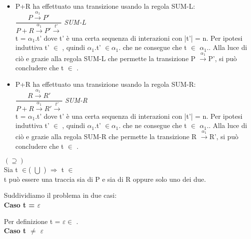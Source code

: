 \begin{itemize}
	\item P+R ha effettuato una transizione usando la regola SUM-L:\\
	
	 	$\dfrac{P \overset{\alpha_{1}}\rightarrow P'}{P + R \overset{\alpha_{1}}\rightarrow P'\overset{t'}\rightarrow}$ \textit{SUM-L} \\
	 	
	 	t = $\alpha_{1}.$t' dove t' è una certa sequenza di interazioni con |t'| = n. Per ipotesi induttiva t' $\in$ , quindi 
	 	$\alpha_{1}.$t' $\in \alpha_{1}.$ che ne consegue che t $\in$ $\alpha_{1}.$. Alla luce di ciò e grazie alla regola SUM-L che permette la transizione P $\overset{\alpha_{1}}\rightarrow $P', si può concludere che  t $\in$  .
	 	\\
	 	
	 \item P+R ha effettuato una transizione usando la regola SUM-R:\\
	 
	 $\dfrac{R \overset{\alpha_{1}}\rightarrow R'}{P + R \overset{\alpha_{1}}\rightarrow R'\overset{t'}\rightarrow}$ \textit{SUM-R} \\
	 
		t = $\alpha_{1}.$t' dove t' è una certa sequenza di interazioni con |t'| = n. Per ipotesi induttiva t' $\in$ , quindi 
	$\alpha_{1}.$t' $\in \alpha_{1}.$ che ne consegue che t $\in$ $\alpha_{1}.$. Alla luce di ciò e grazie alla regola SUM-R che permette la transizione R $\overset{\alpha_{1}}\rightarrow $R', si può concludere che  t $\in$  .
	\\
	 	
\end{itemize}

$(\supseteq)$\\

Sia t $\in$( $\bigcup$ ) $\Rightarrow $  t $\in$\\
t può essere una traccia sia di P e sia di R oppure solo uno dei due.

Suddividiamo il problema in due casi:
\\

\textbf{Caso t = $\varepsilon$}

Per definizione t = $\varepsilon \in $ .
\\

\textbf{Caso t $\not=$ $\varepsilon$}


